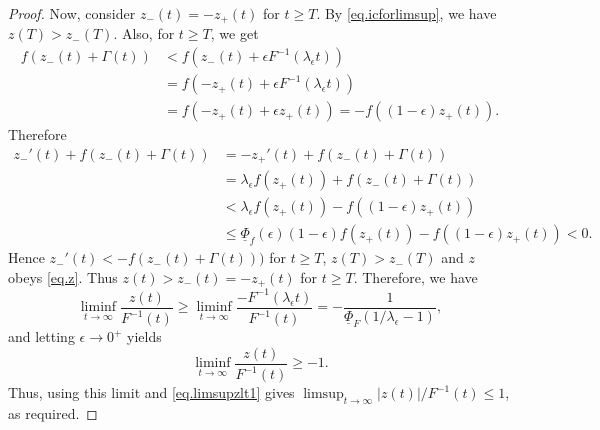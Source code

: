 \documentclass[a4paper,10pt,reqno]{amsart}
\numberwithin{equation}{section}
\theoremstyle{definition}
\theoremstyle{remark}
\DeclareMathOperator{\1}{\mathbbm 1}
\begin{document}
\begin{proof}
		Now, consider $z_-(t)=-z_+(t)$ for $t\geq T$. By \eqref{eq.icforlimsup}, we have $z(T)>z_-(T)$. Also, for $t\geq T$, we get 
		\begin{align*}
			f(z_-(t)+\Gamma(t))&<f(z_-(t)+\epsilon F^{-1}(\lambda_\epsilon t))\\
			&=f(-z_+(t)+\epsilon F^{-1}(\lambda_\epsilon t))\\
			&=f(-z_+(t)+\epsilon z_+(t))=-f((1-\epsilon)z_+(t)).
		\end{align*}
		Therefore
		\begin{align*}
			z_-'(t)+f(z_-(t)+\Gamma(t))&=-z_+'(t)+f(z_-(t)+\Gamma(t))\\
			&=\lambda_\epsilon f(z_+(t))+f(z_-(t)+\Gamma(t))\\
			&<\lambda_\epsilon f(z_+(t))-f((1-\epsilon)z_+(t))\\
			&\leq \underline{\Phi}_f(\epsilon)(1-\epsilon) f(z_+(t)) - f((1-\epsilon)z_+(t))< 0.
		\end{align*}
		Hence $z_-'(t)<-f(z_-(t)+\Gamma(t)))$ for $t\geq T$, $z(T)>z_-(T)$ and $z$ obeys \eqref{eq.z}. Thus $z(t)>z_-(t)=-z_+(t)$ for $t\geq T$. Therefore, we have 
		\[
		\liminf_{t\to\infty} \frac{z(t)}{F^{-1}(t)}
		\geq 
		\liminf_{t\to\infty} \frac{-F^{-1}(\lambda_\epsilon t)}{F^{-1}(t)}
		=-\frac{1}{\underline{\Phi}_F(1/\lambda_\epsilon-1)},
		\]
		and letting $\epsilon\to 0^+$ yields 
		\[
		\liminf_{t\to\infty} \frac{z(t)}{F^{-1}(t)}\geq -1.
		\]
		Thus, using this limit and \eqref{eq.limsupzlt1} gives $\limsup_{t\to\infty} |z(t)|/F^{-1}(t)\leq 1$, as required. 
	\end{proof}
	
\end{document}
